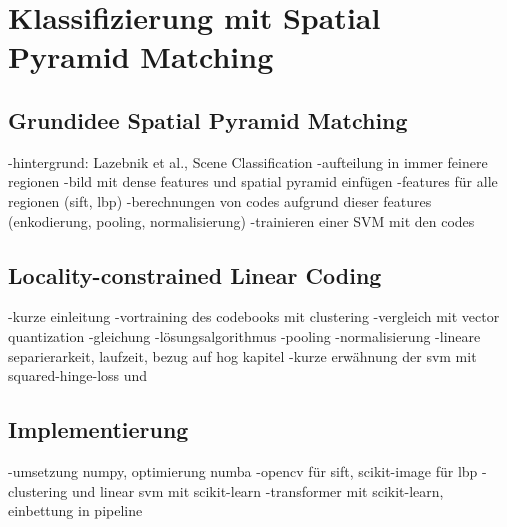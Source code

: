 \section{Klassifizierung mit Spatial Pyramid Matching}

\subsection{Grundidee Spatial Pyramid Matching}

-hintergrund: Lazebnik et al., Scene Classification
-aufteilung in immer feinere regionen
-bild mit dense features und spatial pyramid einfügen
-features für alle regionen (sift, lbp)
-berechnungen von codes aufgrund dieser features (enkodierung, pooling, normalisierung)
-trainieren einer SVM mit den codes

\subsection{Locality-constrained Linear Coding}

-kurze einleitung
-vortraining des codebooks mit clustering
-vergleich mit vector quantization
-gleichung
-lösungsalgorithmus
-pooling
-normalisierung
-lineare separierarkeit, laufzeit, bezug auf hog kapitel
-kurze erwähnung der svm mit squared-hinge-loss und 

\subsection{Implementierung}

-umsetzung numpy, optimierung numba
-opencv für sift, scikit-image für lbp
-clustering und linear svm mit scikit-learn
-transformer mit scikit-learn, einbettung in pipeline
